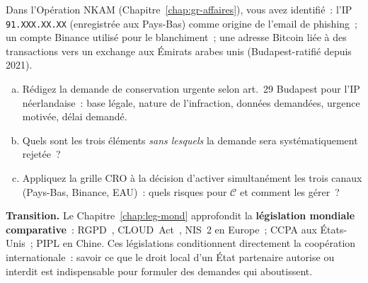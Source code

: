 \begin{boxexo}[title={\ding{45}\quad Exercice~10.3. Rédaction de demande de conservation \niveauexpert}]
Dans l'Opération NKAM (Chapitre~\ref{chap:gr-affaires}), vous avez
identifié~: l'IP \texttt{91.XXX.XX.XX} (enregistrée aux Pays-Bas) comme
origine de l'email de phishing~; un compte Binance utilisé pour le
blanchiment~; une adresse Bitcoin liée à des transactions vers un exchange
aux Émirats arabes unis (Budapest-ratifié depuis 2021).

\begin{enumerate}[(a)]
    \item Rédigez la demande de conservation urgente selon art.~29 Budapest
          pour l'IP néerlandaise~: base légale, nature de l'infraction,
          données demandées, urgence motivée, délai demandé.
    \item Quels sont les trois éléments \emph{sans lesquels} la demande
          sera systématiquement rejetée~?
    \item Appliquez la grille CRO à la décision d'activer simultanément
          les trois canaux (Pays-Bas, Binance, EAU)~: quels risques
          pour $\mathcal{C}$ et comment les gérer~?
\end{enumerate}
\end{boxexo}

\bigskip

\begin{boxinfo}
\textbf{Transition.} Le Chapitre~\ref{chap:leg-mond} approfondit la
\textbf{législation mondiale comparative}~: RGPD~\cite{rgpd2016}, CLOUD~Act~\cite{cloudact2018}, NIS~2 en
Europe~; CCPA aux États-Unis~; PIPL en Chine. Ces législations
conditionnent directement la coopération internationale~: savoir ce que
le droit local d'un État partenaire autorise ou interdit est
indispensable pour formuler des demandes qui aboutissent.
\end{boxinfo}
